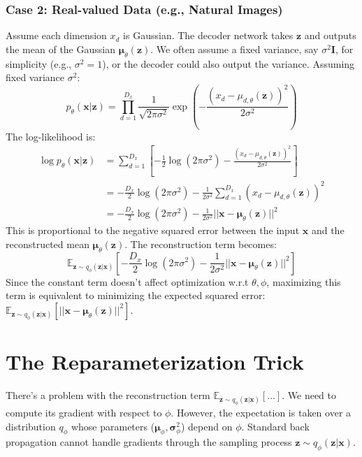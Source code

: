 \documentclass[11pt, letterpaper]{article}
\newcommand{\vx}{\boldsymbol{x}} %
\newcommand{\vz}{\boldsymbol{z}} %
\newcommand{\vmu}{\boldsymbol{\mu}} %
\newcommand{\vsigma}{\boldsymbol{\sigma}} %
\newcommand{\mI}{\boldsymbol{I}} %
\newcommand{\E}{\mathbb{E}} %
\begin{document}
\subsubsection{Case 2: Real-valued Data (e.g., Natural Images)}
Assume each dimension $x_d$ is Gaussian. The decoder network takes $\vz$ and outputs the mean of the Gaussian $\vmu_{\theta}(\vz)$. We often assume a fixed variance, say $\sigma^2 \mI$, for simplicity (e.g., $\sigma^2=1$), or the decoder could also output the variance. Assuming fixed variance $\sigma^2$:
\begin{equation}
    p_{\theta}(\vx|\vz) = \prod_{d=1}^{D_x} \frac{1}{\sqrt{2\pi \sigma^2}} \exp\left(-\frac{(x_d - \mu_{d, \theta}(\vz))^2}{2 \sigma^2}\right)
\end{equation}
The log-likelihood is:
\begin{align}
    \log p_{\theta}(\vx|\vz) &= \sum_{d=1}^{D_x} \left[ -\frac{1}{2} \log(2\pi \sigma^2) - \frac{(x_d - \mu_{d, \theta}(\vz))^2}{2 \sigma^2} \right] \\
    &= -\frac{D_x}{2} \log(2\pi \sigma^2) - \frac{1}{2\sigma^2} \sum_{d=1}^{D_x} (x_d - \mu_{d, \theta}(\vz))^2 \\
    &= -\frac{D_x}{2} \log(2\pi \sigma^2) - \frac{1}{2\sigma^2} ||\vx - \vmu_{\theta}(\vz)||^2
\end{align}
This is proportional to the negative squared error between the input $\vx$ and the reconstructed mean $\vmu_{\theta}(\vz)$. The reconstruction term becomes:
\begin{equation}
    \E_{\vz \sim q_{\phi}(\vz|\vx)} \left[ -\frac{D_x}{2} \log(2\pi \sigma^2) - \frac{1}{2\sigma^2} ||\vx - \vmu_{\theta}(\vz)||^2 \right]
\end{equation}
Since the constant term doesn't affect optimization w.r.t $\theta, \phi$, maximizing this term is equivalent to minimizing the expected squared error: $\E_{\vz \sim q_{\phi}(\vz|\vx)} [||\vx - \vmu_{\theta}(\vz)||^2]$.

\section{The Reparameterization Trick}

There's a problem with the reconstruction term $\E_{\vz \sim q_{\phi}(\vz|\vx)} [\dots]$. We need to compute its gradient with respect to $\phi$. However, the expectation is taken over a distribution $q_{\phi}$ whose parameters ($\vmu_{\phi}, \vsigma^2_{\phi}$) depend on $\phi$. Standard back propagation cannot handle gradients through the sampling process $\vz \sim q_{\phi}(\vz|\vx)$.
\end{document}
